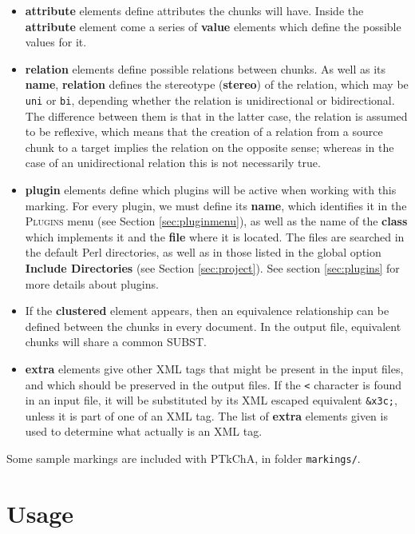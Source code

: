 \documentclass{article}
\begin{document}
\begin{itemize}
\item \textbf{attribute} elements define attributes the chunks will
have. Inside the \textbf{attribute} element come a series of
\textbf{value} elements which define the possible values for it.

\item \textbf{relation} elements define possible relations between
chunks. As well as its \textbf{name}, \textbf{relation} defines the
stereotype (\textbf{stereo}) of the relation, which may be
\texttt{uni} or \texttt{bi}, depending whether the relation is
unidirectional or bidirectional. The difference between them is that
in the latter case, the relation is assumed to be reflexive, which
means that the creation of a relation from a source chunk to a target
implies the relation on the opposite sense; whereas in the case of an
unidirectional relation this is not necessarily true.

\item \textbf{plugin} elements define which plugins will be active
when working with this marking. For every plugin, we must define its
\textbf{name}, which identifies it in the \textsc{Plugins} menu (see
Section \ref{sec:pluginmenu}), as well as the name of the
\textbf{class} which implements it and the \textbf{file} where it is
located. The files are searched in the default Perl directories, as
well as in those listed in the global option \textbf{Include
Directories} (see Section \ref{sec:project}). See section
\ref{sec:plugins} for more details about plugins.

\item If the \textbf{clustered} element appears, then an equivalence
relationship can be defined between the chunks in every document. In
the output file, equivalent chunks will share a common SUBST.

\item \textbf{extra} elements give other XML tags that might be
present in the input files, and which should be preserved in the
output files. If the \verb|<| character is found in an input file, it
will be substituted by its XML escaped equivalent \verb|&x3c;|, unless
it is part of one of an XML tag. The list of \textbf{extra} elements
given is used to determine what actually is an XML tag.
\end{itemize}

Some sample markings are included with PTkChA, in folder
\texttt{markings/}.

\section{Usage}
\end{document}
